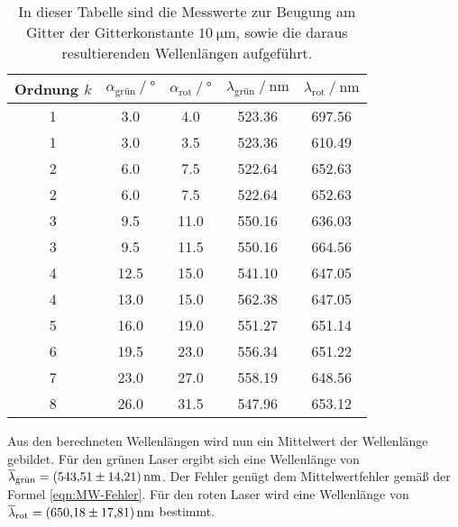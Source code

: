 \begin{table}
  \centering
  \caption{In dieser Tabelle sind die Messwerte zur Beugung am Gitter der Gitterkonstante $\qty{10}{\micro\metre}$, sowie die daraus resultierenden Wellenlängen aufgeführt.}
  \label{tab:Beugung100}
  \begin{tabular}{c S[table-format = 2.1] S[table-format = 2.1] S[table-format = 3.2] S[table-format = 3.2]}
    \toprule
    {Ordnung $k$} & {$\alpha_{\text{grün}} \mathbin{/}\unit{\degree}$} & {$\alpha_{\text{rot}} \mathbin{/}\unit{\degree}$} & {$\lambda_{\text{grün}} \mathbin{/}\unit{\nano\metre}$} & {$\lambda_{\text{rot}} \mathbin{/}\unit{\nano\metre}$}\\
      \midrule
      
      1 &  3.0 &  4.0 & 523.36 & 697.56 \\
      1 &  3.0 &  3.5 & 523.36 & 610.49 \\
      2 &  6.0 &  7.5 & 522.64 & 652.63 \\
    	2 &  6.0 &  7.5 & 522.64 & 652.63 \\    
    	3 &  9.5 & 11.0 & 550.16 & 636.03 \\
    	3 &  9.5 & 11.5 & 550.16 & 664.56 \\
      4 & 12.5 & 15.0 & 541.10 & 647.05 \\
      4 & 13.0 & 15.0 & 562.38 & 647.05 \\
      5 & 16.0 & 19.0 & 551.27 & 651.14 \\
      6 & 19.5 & 23.0 & 556.34 & 651.22 \\
      7 & 23.0 & 27.0 & 558.19 & 648.56 \\
      8 & 26.0 & 31.5 & 547.96 & 653.12 \\
      
      \bottomrule
  \end{tabular}
\end{table}

Aus den berechneten Wellenlängen wird nun ein Mittelwert der Wellenlänge gebildet. Für den grünen Laser ergibt sich eine Wellenlänge von 
$\overline{\lambda}_{\text{grün}} = \qty{543.51 +- 14.21}{\nano\metre}$. Der Fehler genügt dem Mittelwertfehler gemäß der Formel \eqref{eqn:MW-Fehler}.
Für den roten Laser wird eine Wellenlänge von $\overline{\lambda}_{\text{rot}} = \qty{650.18 +- 17.81}{\nano\metre}$ bestimmt.
